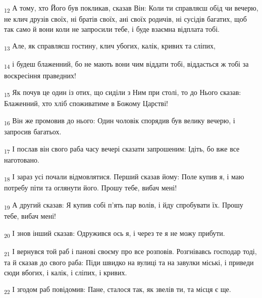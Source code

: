 \begin{tcolorbox}
\textsubscript{12} А тому, хто Його був покликав, сказав Він: Коли ти справляєш обід чи вечерю, не клич друзів своїх, ні братів своїх, ані своїх родичів, ні сусідів багатих, щоб так само й вони коли не запросили тебе, і буде взаємна відплата тобі.
\end{tcolorbox}
\begin{tcolorbox}
\textsubscript{13} Але, як справляєш гостину, клич убогих, калік, кривих та сліпих,
\end{tcolorbox}
\begin{tcolorbox}
\textsubscript{14} і будеш блаженний, бо не мають вони чим віддати тобі, віддасться ж тобі за воскресіння праведних!
\end{tcolorbox}
\begin{tcolorbox}
\textsubscript{15} Як почув це один із отих, що сиділи з Ним при столі, то до Нього сказав: Блаженний, хто хліб споживатиме в Божому Царстві!
\end{tcolorbox}
\begin{tcolorbox}
\textsubscript{16} Він же промовив до нього: Один чоловік спорядив був велику вечерю, і запросив багатьох.
\end{tcolorbox}
\begin{tcolorbox}
\textsubscript{17} І послав він свого раба часу вечері сказати запрошеним: Ідіть, бо вже все наготовано.
\end{tcolorbox}
\begin{tcolorbox}
\textsubscript{18} І зараз усі почали відмовлятися. Перший сказав йому: Поле купив я, і маю потребу піти та оглянути його. Прошу тебе, вибач мені!
\end{tcolorbox}
\begin{tcolorbox}
\textsubscript{19} А другий сказав: Я купив собі п'ять пар волів, і йду спробувати їх. Прошу тебе, вибач мені!
\end{tcolorbox}
\begin{tcolorbox}
\textsubscript{20} І знов інший сказав: Одружився ось я, і через те я не можу прибути.
\end{tcolorbox}
\begin{tcolorbox}
\textsubscript{21} І вернувся той раб і панові своєму про все розповів. Розгнівавсь господар тоді, та й сказав до свого раба: Піди швидко на вулиці та на завулки міські, і приведи сюди вбогих, і калік, і сліпих, і кривих.
\end{tcolorbox}
\begin{tcolorbox}
\textsubscript{22} І згодом раб повідомив: Пане, сталося так, як звелів ти, та місця є ще.
\end{tcolorbox}
